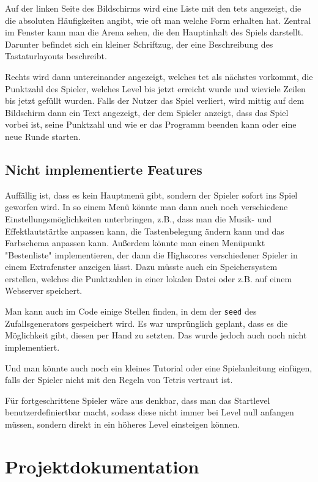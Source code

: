 \documentclass[11pt]{article}
\newcommand{\lstin}[1]{\lstinline[language=C]{#1}}
\begin{document}
Auf der linken Seite des Bildschirms wird eine Liste mit den \glspl{tet} angezeigt, die die absoluten Häufigkeiten angibt, 
wie oft man welche Form erhalten hat. 
Zentral im Fenster kann man die Arena sehen, die den Hauptinhalt des Spiels darstellt. Darunter befindet sich ein kleiner Schriftzug, der eine Beschreibung des Tastaturlayouts beschreibt.

Rechts wird dann untereinander angezeigt, welches \gls{tet} als nächstes vorkommt, die Punktzahl des Spieler, welches Level bis jetzt erreicht wurde und wieviele Zeilen bis jetzt gefüllt wurden.
Falls der Nutzer das Spiel verliert, wird mittig auf dem Bildschirm dann ein Text angezeigt, der dem Spieler anzeigt, dass das Spiel vorbei ist, seine Punktzahl und wie
er das Programm beenden kann oder eine neue Runde starten.

\subsection{Nicht implementierte Features} \label{uif}

Auffällig ist, dass es kein Hauptmenü gibt, sondern der Spieler sofort ins Spiel geworfen wird. 
In so einem Menü könnte man dann auch noch verschiedene Einstellungsmöglichkeiten unterbringen, z.B., 
dass man die Musik- und Effektlautstärtke anpassen kann, die Tastenbelegung ändern kann und das Farbschema anpassen kann.
Außerdem könnte man einen Menüpunkt "Bestenliste" implementieren, der dann die Highscores verschiedener Spieler in einem Extrafenster anzeigen lässt.
Dazu müsste auch ein Speichersystem erstellen, welches die Punktzahlen in einer lokalen Datei oder z.B. auf einem Webserver speichert.

Man kann auch im Code einige Stellen finden, in dem der \lstin{seed} des Zufallsgenerators gespeichert wird. Es war ursprünglich geplant, 
dass es die Möglichkeit gibt, diesen per Hand zu setzten. Das wurde jedoch auch noch nicht implementiert.

Und man könnte auch noch ein kleines Tutorial oder eine Spielanleitung einfügen, falls der Spieler nicht mit den Regeln von Tetris vertraut ist.

Für fortgeschrittene Spieler wäre aus denkbar, dass man das Startlevel benutzerdefiniertbar macht, sodass diese nicht immer bei Level null anfangen müssen,
sondern direkt in ein höheres Level einsteigen können.
\pagebreak

\section{Projektdokumentation}
\end{document}
